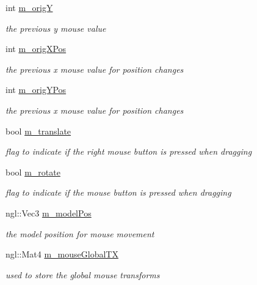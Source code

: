 \begin{DoxyCompactItemize}
int \hyperlink{classGLWindow_ab7a1ee2202588e005b90c99ea1323af4}{m\_\-origY}
\begin{DoxyCompactList}\small\item\em the previous y mouse value \item\end{DoxyCompactList}\item 
int \hyperlink{classGLWindow_a176afd6632502975d692b69a90488670}{m\_\-origXPos}
\begin{DoxyCompactList}\small\item\em the previous x mouse value for position changes \item\end{DoxyCompactList}\item 
int \hyperlink{classGLWindow_aab805b77275ea41e8ff2dcf9e714f345}{m\_\-origYPos}
\begin{DoxyCompactList}\small\item\em the previous x mouse value for position changes \item\end{DoxyCompactList}\item 
bool \hyperlink{classGLWindow_a3a7f7ae3fbde7c5e24ff677a6ed34563}{m\_\-translate}
\begin{DoxyCompactList}\small\item\em flag to indicate if the right mouse button is pressed when dragging \item\end{DoxyCompactList}\item 
bool \hyperlink{classGLWindow_a1b5d8b223995bc9740074c5342fe8e38}{m\_\-rotate}
\begin{DoxyCompactList}\small\item\em flag to indicate if the mouse button is pressed when dragging \item\end{DoxyCompactList}\item 
ngl::Vec3 \hyperlink{classGLWindow_a222840baf9b594f95626a55563904684}{m\_\-modelPos}
\begin{DoxyCompactList}\small\item\em the model position for mouse movement \item\end{DoxyCompactList}\item 
ngl::Mat4 \hyperlink{classGLWindow_ae4cf79c7e425b4033ccef92aa517130a}{m\_\-mouseGlobalTX}
\begin{DoxyCompactList}\small\item\em used to store the global mouse transforms \item\end{DoxyCompactList}\end{DoxyCompactItemize}



